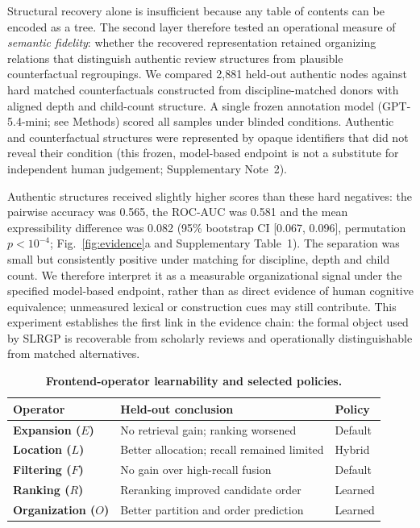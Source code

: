 \documentclass[11pt,a4paper]{article}
\begin{document}
Structural recovery alone is insufficient because any table of contents can be encoded as a tree. The second layer therefore tested an operational measure of \emph{semantic fidelity}: whether the recovered representation retained organizing relations that distinguish authentic review structures from plausible counterfactual regroupings. We compared 2,881 held-out authentic nodes against hard matched counterfactuals constructed from discipline-matched donors with aligned depth and child-count structure. A single frozen annotation model (GPT-5.4-mini; see Methods) scored all samples under blinded conditions. Authentic and counterfactual structures were represented by opaque identifiers that did not reveal their condition (this frozen, model-based endpoint is not a substitute for independent human judgement; Supplementary Note~2).

Authentic structures received slightly higher scores than these hard negatives: the pairwise accuracy was 0.565, the ROC-AUC was 0.581 and the mean expressibility difference was 0.082 (95\% bootstrap CI [0.067, 0.096], permutation $p<10^{-4}$; Fig.~\ref{fig:evidence}a and Supplementary Table~1). The separation was small but consistently positive under matching for discipline, depth and child count. We therefore interpret it as a measurable organizational signal under the specified model-based endpoint, rather than as direct evidence of human cognitive equivalence; unmeasured lexical or construction cues may still contribute. This experiment establishes the first link in the evidence chain: the formal object used by SLRGP is recoverable from scholarly reviews and operationally distinguishable from matched alternatives.

\begin{table}[!b]
\caption{\textbf{Frontend-operator learnability and selected policies.}}
\label{tab:s2}
\centering
\small
\setlength{\tabcolsep}{5pt}
\renewcommand{\arraystretch}{1.08}
\begin{tabularx}{\linewidth}{@{}
  >{\raggedright\arraybackslash}p{3.10cm}
  >{\raggedright\arraybackslash}X
  >{\raggedright\arraybackslash}p{1.75cm}
@{}}
\toprule
\textbf{Operator} & \textbf{Held-out conclusion} & \textbf{Policy} \\
\midrule
\textbf{Expansion ($E$)} & No retrieval gain; ranking worsened & Default \\
\addlinespace[1.5pt]
\textbf{Location ($L$)} & Better allocation; recall remained limited & Hybrid \\
\addlinespace[1.5pt]
\textbf{Filtering ($F$)} & No gain over high-recall fusion & Default \\
\addlinespace[1.5pt]
\textbf{Ranking ($R$)} & Reranking improved candidate order & Learned \\
\addlinespace[1.5pt]
\textbf{Organization ($O$)} & Better partition and order prediction & Learned \\
\bottomrule
\end{tabularx}
\end{table}
\end{document}
